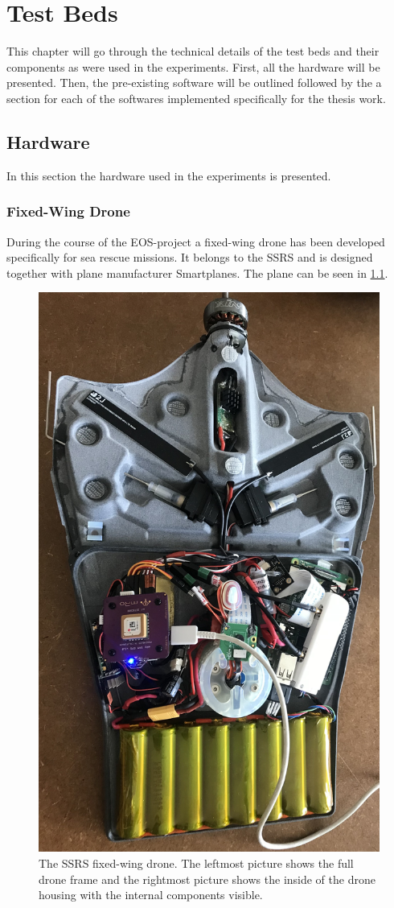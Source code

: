 \documentclass[nofilelist]{cslthse-msc}
\begin{document}
\chapter{Test Beds}
This chapter will go through the technical details of the test beds and their components as were used in the experiments. First, all the hardware will be presented. Then, the pre-existing software will be outlined followed by the a section for each of the softwares implemented specifically for the thesis work.

\section{Hardware}
In this section the hardware used in the experiments is presented.

\subsection{Fixed-Wing Drone}
During the course of the EOS-project a fixed-wing drone has been developed specifically for sea rescue missions. It belongs to the SSRS and is designed together with plane manufacturer Smartplanes. The plane can be seen in \ref{fig:fv-drone-pics}.

\begin{figure}[htp]
   \centering
   \includegraphics[width=.35\textwidth]{images/fv-1.jpg}
   \caption{The SSRS fixed-wing drone. The leftmost picture shows the full drone frame and the rightmost picture shows the inside of the drone housing with the internal components visible.}
   \label{fig:fv-drone-pics}
\end{figure}
\end{document}
